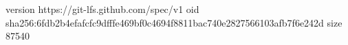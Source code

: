 version https://git-lfs.github.com/spec/v1
oid sha256:6fdb2b4efafcfc9dfffe469bf0c4694f8811bac740e2827566103afb7f6e242d
size 87540
